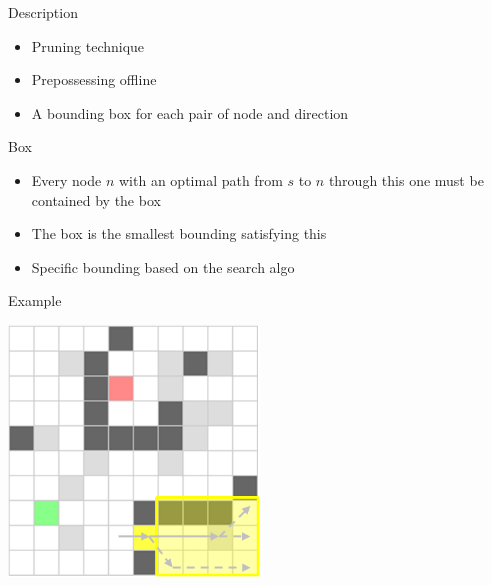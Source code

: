 \documentclass{presentation}
\begin{document}
\begin{frame}
\end{frame}



\begin{frame}{Description}
    \begin{itemize}
        \item Pruning technique
        \item Prepossessing offline
        \item A bounding box for each pair of node and direction

    \end{itemize}
\end{frame}


\begin{frame}{Box}
    \begin{itemize}
        \item Every node $n$ with an optimal path from $s$ to $n$ through this one must be contained by the box
        \item The box is the smallest bounding satisfying this
        \item Specific bounding based on the search algo
    \end{itemize}
\end{frame}


\begin{frame}{Example}
    \begin{center}
        \includegraphics[width=0.5\textwidth]{figures/bounding_boxes1.png}
    \end{center}
\end{frame}
\end{document}
